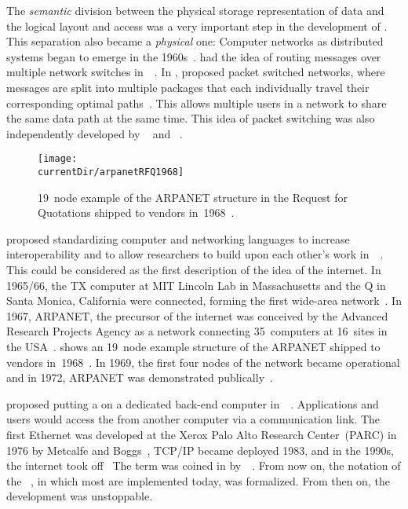 The \emph{semantic} division between the physical storage representation of data and the logical layout and access was a very important step in the development of .
This separation also became a \emph{physical} one:
Computer networks as distributed systems began to emerge in the 1960s~\cite{KR2020CNATDA}.
 had the idea of routing messages over multiple network switches in~\citeyear{B1960OADCACSC}~\cite{B1964ODCIITDCN,B1964ODCVHAAAC,B1965ABOTDAMBN,B1960OADCACSC,B1962ODCN}.
In \citeyear{K1961IFILCNPTP}, \citeauthor{K1961IFILCNPTP} proposed packet switched networks, where messages are split into multiple packages that each individually travel their corresponding optimal paths~\cite{K1961IFILCNPTP}.
This allows multiple users in a network to share the same data path at the same time.
This idea of packet switching was also independently developed by \citeauthor{B1962ODCN}~\cite{B1962ODCN} and \citeauthor{D1965ROLDPAICN}~\cite{D1965ROLDPAICN,D1965PFTDOANCSFOLDP,D1966PFADCN}.

\begin{figure}%
\centering%
\texttt{[image: \\currentDir/arpanetRFQ1968]}%
\caption{19~node example of the ARPANET structure in the Request for Quotations shipped to vendors in~1968~\cite{K2010AEHOTIHOC}.}%
\label{fig:arpanetRFQ1968}%
\end{figure}%

 proposed standardizing computer and networking languages to increase interoperability and to allow researchers to build upon each other's work in~\citeyear{L1963MFMAAOTICN}~\cite{L1963MFMAAOTICN}.
This could be considered as the first description of the idea of the internet.
In 1965/66, the TX computer at MIT Lincoln Lab in Massachusetts and the Q in Santa Monica, California were connected, forming the first wide-area network~\cite{L1986TAACN}.
In 1967, ARPANET, the precursor of the internet was conceived by the Advanced Research Projects Agency as a network connecting 35~computers at 16~sites in the USA~\cite{L1986TAACN,KR2020CNATDA}.
 shows an 19~node example structure of the ARPANET shipped to vendors in~1968~\cite{K2010AEHOTIHOC}.
In 1969, the first four nodes of the network became operational and in 1972, ARPANET was demonstrated publically~\cite{L1986TAACN,KR2020CNATDA}.

 proposed putting a  on a dedicated back-end computer in~\citeyear{CHIRW1974ABECFDBM}~\cite{CHIRW1974ABECFDBM}.
Applications and users would access the  from another computer via a communication link.
The first Ethernet was developed at the Xerox Palo Alto Research Center~(PARC) in 1976 by Metcalfe and Boggs~\cite{CHM1996CLN}, TCP/IP became deployed 1983, and in the 1990s, the internet took off~\cite{KR2020CNATDA}
The term  was coined in \citeyear{IMS1978SDFFIADFS} by~\citeauthor{IMS1978SDFFIADFS}~\cite{IMS1978SDFFIADFS}.
From now on, the notation of the ~\cite{RCKS2019PNP,B1996CSA,OHE1999CSSG,RF2020FOSAAEA,EOEBEB:CSA}, in which most  are implemented today, was formalized.
From then on, the development was unstoppable.

